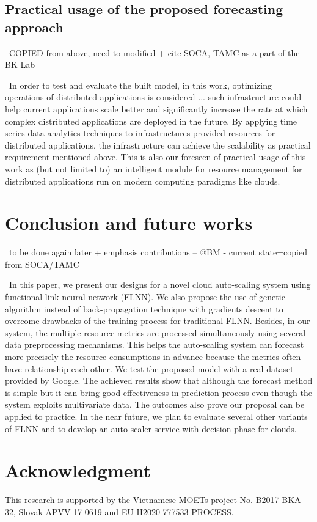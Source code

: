 \documentclass[review,3p,authoryear]{elsarticle}
\def \GN#1{\textcolor{tn_orange}{~#1}}			%
\begin{document}
{\subsection{Practical usage of the proposed forecasting approach}
\GN{COPIED from above, need to modified + cite SOCA, TAMC as a part of the BK Lab}

\GN{In order to test and evaluate the built model, in this work, optimizing operations of distributed applications is considered ... such infrastructure could help current applications scale better and significantly increase the rate at which complex distributed applications are deployed in the future. By applying time series data analytics techniques to infrastructures provided resources for distributed applications, the infrastructure can achieve the scalability as practical requirement mentioned above. This is also our foreseen of practical usage of this work as (but not limited to) an intelligent module for resource management for distributed applications run on modern computing paradigms like clouds. }



\section{Conclusion and future works}
\label{conclusion}
\GN{to be done again later + emphasis contributions -- @BM - current state=copied from SOCA/TAMC}

\GN{In this paper, we present our designs for a novel cloud auto-scaling system using functional-link neural network (FLNN). We also propose the use of genetic algorithm instead of back-propagation technique with gradients descent to overcome drawbacks of the training process for traditional FLNN. Besides, in our system, the multiple resource metrics are processed simultaneously using several data preprocessing mechanisms. This helps the auto-scaling system can forecast more precisely the resource consumptions in advance because the metrics often have relationship each other. We test the proposed model with a real dataset provided by Google. The achieved results show that although the forecast method is simple but it can bring good effectiveness in prediction process even though the system exploits multivariate data. The outcomes also prove our proposal can be applied to practice. In the near future, we plan to evaluate several other variants of FLNN and to develop an auto-scaler service with decision phase for clouds.}


\section*{Acknowledgment} This research is supported by the 
Vietnamese MOETs project No. B2017-BKA-32, 
Slovak APVV-17-0619 and EU H2020-777533 PROCESS.


}
\end{document}
